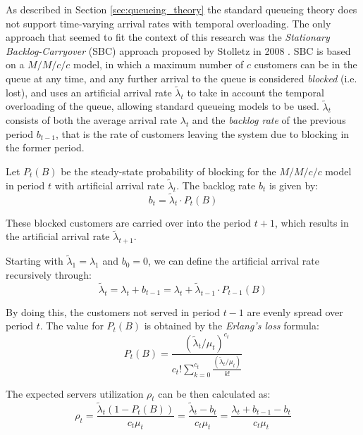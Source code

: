 As described in Section \ref{sec:queueing_theory} the standard queueing theory does not support time-varying arrival rates with temporal overloading. The only approach that seemed to fit the context of this research was the \emph{Stationary Backlog-Carryover} (SBC) approach proposed by Stolletz in 2008 \cite{stolletz}. SBC is based on a \( M/M/c/c \) model, in which a maximum number of \( c \) customers can be in the queue at any time, and any further arrival to the queue is considered \emph{blocked} (i.e. lost), and uses an artificial arrival rate \( \widetilde{\lambda}_t \) to take in account the temporal overloading of the queue, allowing standard queueing models to be used. \( \widetilde{\lambda}_t \) consists of both the average arrival rate \( \lambda_t \) and the \emph{backlog rate} of the previous period \( b_{t-1} \), that is the rate of customers leaving the system due to blocking in the former period.

Let \( P_t(B) \) be the steady-state probability of blocking for the \( M/M/c/c \) model in period \( t \) with artificial arrival rate \( \widetilde{\lambda}_t \). The backlog rate \( b_t \) is given by:
\begin{equation}
  b_t = \widetilde{\lambda}_t \cdot P_t(B)
\end{equation}

These blocked customers are carried over into the period \( t+1 \), which results in the artificial arrival rate \( \widetilde{\lambda}_{t+1} \).

Starting with \( \widetilde{\lambda}_1 = \lambda_1 \) and \( b_0 = 0 \), we can define the artificial arrival rate recursively through:
\begin{equation}
  \widetilde{\lambda}_t = \lambda_t + b_{t-1} = \lambda_t + \widetilde{\lambda}_{t-1} \cdot P_{t-1}(B)
\end{equation}

By doing this, the customers not served in period \( t-1 \) are evenly spread over period \( t \). The value for \( P_t(B) \) is obtained by the \emph{Erlang’s loss} formula:
\begin{equation}
  P_t(B) = \frac{(\widetilde{\lambda}_t / \mu_t)^{c_t}}{c_t!\sum_{k=0}^{c_t} \frac{(\widetilde{\lambda}_t / \mu_t)}{k!}}
\end{equation}

The expected servers utilization \( \rho_t \) can be then calculated as:
\begin{equation}
  \rho_t = \frac{\widetilde{\lambda}_t(1 - P_t(B))}{c_t\mu_t} = \frac{\widetilde{\lambda}_t - b_t}{c_t\mu_t} = \frac{\lambda_t + b_{t-1} - b_t}{c_t\mu_t}
  \label{eq:2}
\end{equation}

